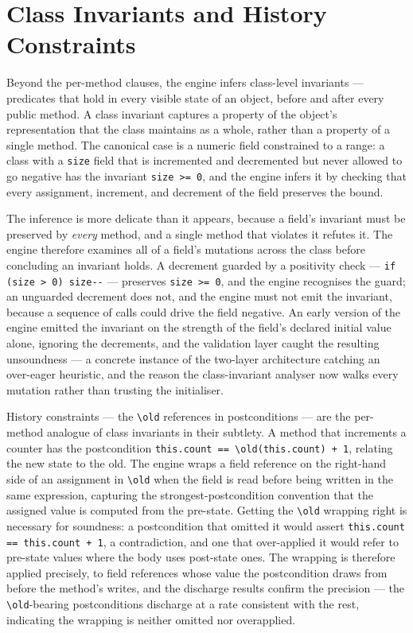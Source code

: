 \section{Class Invariants and History Constraints}
\label{sec:inf-invariants}

Beyond the per-method clauses, the engine infers class-level invariants ---
predicates that hold in every visible state of an object, before and after every
public method. A class invariant captures a property of the object's
representation that the class maintains as a whole, rather than a property of a
single method. The canonical case is a numeric field constrained to a range: a
class with a \texttt{size} field that is incremented and decremented but never
allowed to go negative has the invariant \texttt{size >= 0}, and the engine infers
it by checking that every assignment, increment, and decrement of the field
preserves the bound.

The inference is more delicate than it appears, because a field's invariant must
be preserved by \emph{every} method, and a single method that violates it refutes
it. The engine therefore examines all of a field's mutations across the class
before concluding an invariant holds. A decrement guarded by a positivity check
--- \texttt{if (size > 0) size{-}{-}} --- preserves \texttt{size >= 0}, and the
engine recognises the guard; an unguarded decrement does not, and the engine must
not emit the invariant, because a sequence of calls could drive the field
negative. An early version of the engine emitted the invariant on the strength of
the field's declared initial value alone, ignoring the decrements, and the
validation layer caught the resulting unsoundness --- a concrete instance of the
two-layer architecture catching an over-eager heuristic, and the reason the
class-invariant analyser now walks every mutation rather than trusting the
initialiser.

History constraints --- the \texttt{\textbackslash old} references in
postconditions --- are the per-method analogue of class invariants in their
subtlety. A method that increments a counter has the postcondition
\texttt{this.count == \textbackslash old(this.count) + 1}, relating the new state
to the old. The engine wraps a field reference on the right-hand side of an
assignment in \texttt{\textbackslash old} when the field is read before being
written in the same expression, capturing the strongest-postcondition convention
that the assigned value is computed from the pre-state. Getting the
\texttt{\textbackslash old} wrapping right is necessary for soundness: a
postcondition that omitted it would assert \texttt{this.count == this.count + 1},
a contradiction, and one that over-applied it would refer to pre-state values
where the body uses post-state ones. The wrapping is therefore applied precisely,
to field references whose value the postcondition draws from before the method's
writes, and the discharge results confirm the precision --- the
\texttt{\textbackslash old}-bearing postconditions discharge at a rate consistent
with the rest, indicating the wrapping is neither omitted nor overapplied.

